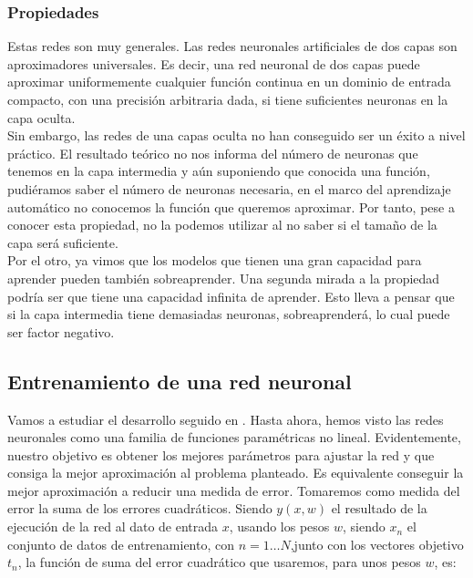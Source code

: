 \subsubsection{Propiedades}

Estas redes son muy generales. Las redes neuronales artificiales de dos capas son aproximadores universales. Es decir, una red neuronal de dos capas puede aproximar uniformemente cualquier función continua en un dominio de entrada compacto, con una precisión arbitraria dada, si tiene suficientes neuronas en la capa oculta\cite{Cybenco}\cite{Hornik}.\\

Sin embargo, las redes de una capas oculta no han conseguido ser un éxito a nivel práctico. El resultado teórico no nos informa del número de neuronas que tenemos en la capa intermedia y aún suponiendo que conocida una función, pudiéramos saber el número de neuronas necesaria, en el marco del aprendizaje automático no conocemos la función que queremos aproximar. Por tanto, pese a conocer esta propiedad, no la podemos utilizar al no saber si el tamaño de la capa será suficiente.\\

Por el otro, ya vimos que los modelos que tienen una gran capacidad para aprender pueden también sobreaprender. Una segunda mirada a la propiedad podría ser que tiene una capacidad infinita de aprender. Esto lleva a pensar que si la capa intermedia tiene demasiadas neuronas, sobreaprenderá, lo cual puede ser factor negativo.\\


\subsection{Entrenamiento de una red neuronal}

Vamos a estudiar el desarrollo seguido en \cite{Bishop:2006:PRM:1162264}. Hasta ahora, hemos visto las redes neuronales como una familia de funciones paramétricas no lineal. Evidentemente, nuestro objetivo es obtener los mejores parámetros para ajustar la red y que consiga la mejor aproximación al problema planteado. Es equivalente conseguir la mejor aproximación a reducir una medida de error. Tomaremos como medida del error la suma de los errores cuadráticos. Siendo $y(x,w)$ el resultado de la ejecución de la red al dato de entrada $x$, usando los pesos $w$, siendo ${x_n}$ el conjunto de datos de entrenamiento, con $n=1\ldots N$,junto con los vectores objetivo ${t_n}$, la función de suma del error cuadrático que usaremos, para unos pesos $w$, es:

